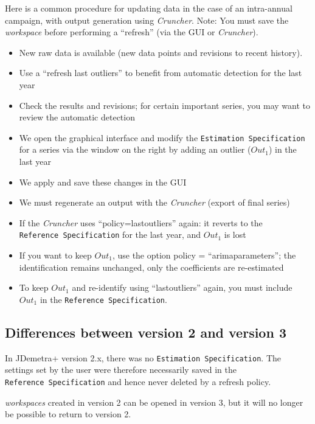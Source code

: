 \documentclass[
  letterpaper,
  DIV=11,
  numbers=noendperiod]{scrreprt}
\begin{document}
Here is a common procedure for updating data in the case of an
intra-annual campaign, with output generation using \emph{Cruncher}.
Note: You must save the \emph{workspace} before performing a ``refresh''
(via the GUI or \emph{Cruncher}).

\begin{itemize}
\item
  New raw data is available (new data points and revisions to recent
  history).
\item
  Use a ``refresh last outliers'' to benefit from automatic detection
  for the last year
\item
  Check the results and revisions; for certain important series, you may
  want to review the automatic detection
\item
  We open the graphical interface and modify the
  \texttt{Estimation\ Specification} for a series via the window on the
  right by adding an outlier (\(Out_1\)) in the last year
\item
  We apply and save these changes in the GUI
\item
  We must regenerate an output with the \emph{Cruncher} (export of final
  series)
\item
  If the \emph{Cruncher} uses ``policy=lastoutliers'' again: it reverts
  to the \texttt{Reference\ Specification} for the last year, and
  \(Out_1\) is lost
\item
  If you want to keep \(Out_1\), use the option policy =
  ``arimaparameters''; the identification remains unchanged, only the
  coefficients are re-estimated
\item
  To keep \(Out_1\) and re-identify using ``lastoutliers'' again, you
  must include \(Out_1\) in the \texttt{Reference\ Specification}.
\end{itemize}

\hypertarget{spec-v2-v3}{%
\subsection*{Differences between version 2 and version
3}\label{spec-v2-v3}}

In JDemetra+ version 2.x, there was no
\texttt{Estimation\ Specification}. The settings set by the user were
therefore necessarily saved in the \texttt{Reference\ Specification} and
hence never deleted by a refresh policy.

\emph{workspaces} created in version 2 can be opened in version 3, but
it will no longer be possible to return to version 2.
\end{document}
